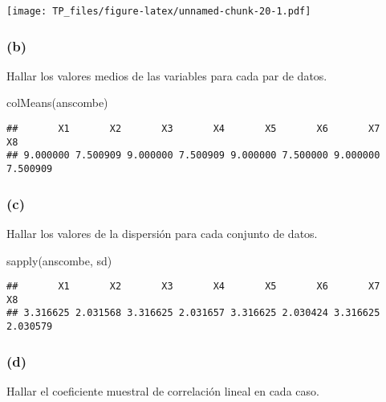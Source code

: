 \documentclass[
]{article}
\newenvironment{Shaded}{\begin{snugshade}}{\end{snugshade}}
\newcommand{\AttributeTok}[1]{\textcolor[rgb]{0.77,0.63,0.00}{#1}}
\newcommand{\DecValTok}[1]{\textcolor[rgb]{0.00,0.00,0.81}{#1}}
\newcommand{\FunctionTok}[1]{\textcolor[rgb]{0.00,0.00,0.00}{#1}}
\newcommand{\NormalTok}[1]{#1}
\newcommand{\SpecialCharTok}[1]{\textcolor[rgb]{0.00,0.00,0.00}{#1}}
\newcommand{\StringTok}[1]{\textcolor[rgb]{0.31,0.60,0.02}{#1}}
\begin{document}
\texttt{[image: TP\_files/figure-latex/unnamed-chunk-20-1.pdf]}

\hypertarget{b-1}{%
\subsubsection{(b)}\label{b-1}}

Hallar los valores medios de las variables para cada par de datos.

\begin{Shaded}
\begin{Highlighting}[]
\FunctionTok{colMeans}\NormalTok{(anscombe)}
\end{Highlighting}
\end{Shaded}

\begin{verbatim}
##       X1       X2       X3       X4       X5       X6       X7       X8 
## 9.000000 7.500909 9.000000 7.500909 9.000000 7.500000 9.000000 7.500909
\end{verbatim}

\hypertarget{c-1}{%
\subsubsection{(c)}\label{c-1}}

Hallar los valores de la dispersión para cada conjunto de datos.

\begin{Shaded}
\begin{Highlighting}[]
\FunctionTok{sapply}\NormalTok{(anscombe, sd)}
\end{Highlighting}
\end{Shaded}

\begin{verbatim}
##       X1       X2       X3       X4       X5       X6       X7       X8 
## 3.316625 2.031568 3.316625 2.031657 3.316625 2.030424 3.316625 2.030579
\end{verbatim}

\hypertarget{d}{%
\subsubsection{(d)}\label{d}}

Hallar el coeficiente muestral de correlación lineal en cada caso.

\begin{Shaded}
\end{Shaded}
\end{document}
